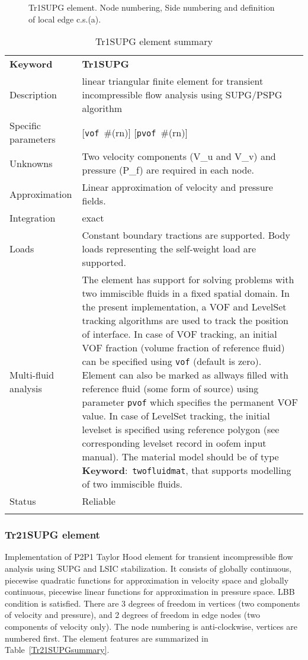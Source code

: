 \documentclass[a4paper]{article}
\newcommand{\descitem}[1]{{\noindent \textbf{#1}}:}
\newcommand{\elemkeyword}[1]{\descitem{Keyword}~\param{#1}} %
\newcommand{\param}[1]{\texttt{#1}} %
\newcommand{\optional}[1]{[#1]} %
\newcommand{\field}[2]{\param{#1}~\#{\tiny(#2)}} %
\newcommand{\optField}[2]{\optional{\field{#1}{#2}}}
\newcommand{\templabel}{}%
\newcommand{\tempcaption}{}%
\newcounter{nelpar}
\newenvironment{elementsummary}[5]{%
  \gdef\tempcaption{#4}%
  \gdef\templabel{#5}%
  \setcounter{nelpar}{0}%
  \begin{center} %
    \begin{table}[!htb] %
      \begin{tabular}{|l|p{9cm}|}\hline %
        {\bf Keyword} & \bf{#1}\\ %
        {Description} & {#2}\\ %
        {Specific parameters} & {#3}\\ \hline %
}{
  \\ \hline %
      \end{tabular}%
      \caption{\tempcaption}%
      \label{\templabel}%
    \end{table}%
  \end{center}%
}
\newcommand{\elementDescription}[2]{{#1} & {#2}\\ }
\begin{document}
\begin{figure}[htb]
 \centering
 \begin{makeimage}
  
 \end{makeimage}
 \caption{Tr1SUPG element. Node numbering, Side numbering and
 definition of local edge c.s.(a).}
 \label{Tr1SUPG2fig}
\end{figure}

\begin{elementsummary}{Tr1SUPG}{linear triangular finite element for transient
incompressible flow analysis using SUPG/PSPG algorithm}{\optField{vof}{rn} \optField{pvof}{rn}}{Tr1SUPG element summary}{Tr1SUPGsummary}
\elementDescription{Unknowns}{Two velocity components (V\_u and V\_v) and pressure (P\_f) are required in each node.}
\elementDescription{Approximation}{Linear approximation of velocity and pressure fields.}
\elementDescription{Integration}{exact}
\elementDescription{Loads}{Constant boundary tractions are supported. Body loads
representing the self-weight load are supported.}
\elementDescription{Multi-fluid analysis}{The element has support for solving
problems with two immiscible fluids in
a fixed spatial domain. In the present implementation, a VOF and LevelSet tracking algorithms
are used to track the position of interface. In case of VOF tracking, an initial VOF fraction
(volume fraction of reference fluid) can be specified using
\param{vof} (default is zero). Element can also be marked as allways
filled with reference fluid (some form of source) using parameter
\param{pvof} which specifies the permanent VOF value. In case of LevelSet tracking, the initial levelset is specified using 
reference polygon (see corresponding levelset record in oofem input manual).
The material model should be of type \elemkeyword{twofluidmat}, that
supports modelling of two immiscible fluids.}
\elementDescription{Status}{Reliable}
\end{elementsummary}


\subsubsection{Tr21SUPG element}
\label{Tr21SUPG}
Implementation of P2P1 Taylor Hood element for transient incompressible flow analysis 
using SUPG and LSIC stabilization. It consists of globally continuous, piecewise quadratic functions for 
approximation in velocity space and globally continuous, piecewise linear functions for
approximation in pressure space. LBB condition is satisfied. There are 3 degrees
of freedom in vertices (two components of velocity and pressure), and 2 degrees of freedom
in edge nodes (two components of velocity only).
The node numbering is anti-clockwise, vertices are numbered first. The element features are summarized in Table~\ref{Tr21SUPGsummary}.
\end{document}
